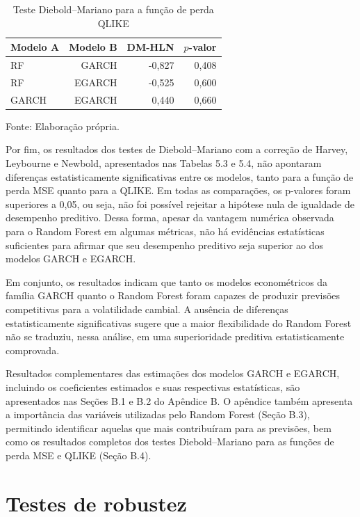 \begin{table}[!htbp]
    \centering
    \caption{Teste Diebold--Mariano para a função de perda QLIKE}
    \label{tab:dm_qlike}
    \begin{tabular}{lrrr}
        \toprule
        Modelo A & Modelo B & DM-HLN & $p$-valor \\
        \midrule
        RF    & GARCH  & -0,827 & 0,408 \\
        RF    & EGARCH & -0,525 & 0,600 \\
        GARCH & EGARCH &  0,440 & 0,660 \\
        \bottomrule
    \end{tabular}
    \begin{center}
        \footnotesize Fonte: Elaboração própria.
    \end{center}
\end{table}

Por fim, os resultados dos testes de Diebold–Mariano com a correção de Harvey, Leybourne e Newbold, apresentados nas Tabelas 5.3 e 5.4, não apontaram diferenças 
estatisticamente significativas entre os modelos, tanto para a função de perda MSE quanto para a QLIKE. Em todas as comparações, os p-valores foram superiores a 0,05, 
ou seja, não foi possível rejeitar a hipótese nula de igualdade de desempenho preditivo. Dessa forma, apesar da vantagem numérica observada para o Random Forest em 
algumas métricas, não há evidências estatísticas suficientes para afirmar que seu desempenho preditivo seja superior ao dos modelos GARCH e EGARCH.

Em conjunto, os resultados indicam que tanto os modelos econométricos da família GARCH quanto o Random Forest foram capazes de produzir previsões competitivas para 
a volatilidade cambial. A ausência de diferenças estatisticamente significativas sugere que a maior flexibilidade do Random Forest não se traduziu, nessa análise, 
em uma superioridade preditiva estatisticamente comprovada.

Resultados complementares das estimações dos modelos GARCH e EGARCH, incluindo os coeficientes estimados e suas respectivas estatísticas, são apresentados nas 
Seções B.1 e B.2 do Apêndice B. O apêndice também apresenta a importância das variáveis utilizadas pelo Random Forest (Seção B.3), permitindo identificar aquelas 
que mais contribuíram para as previsões, bem como os resultados completos dos testes Diebold–Mariano para as funções de perda MSE e QLIKE (Seção B.4).


\FloatBarrier
\section{Testes de robustez}

